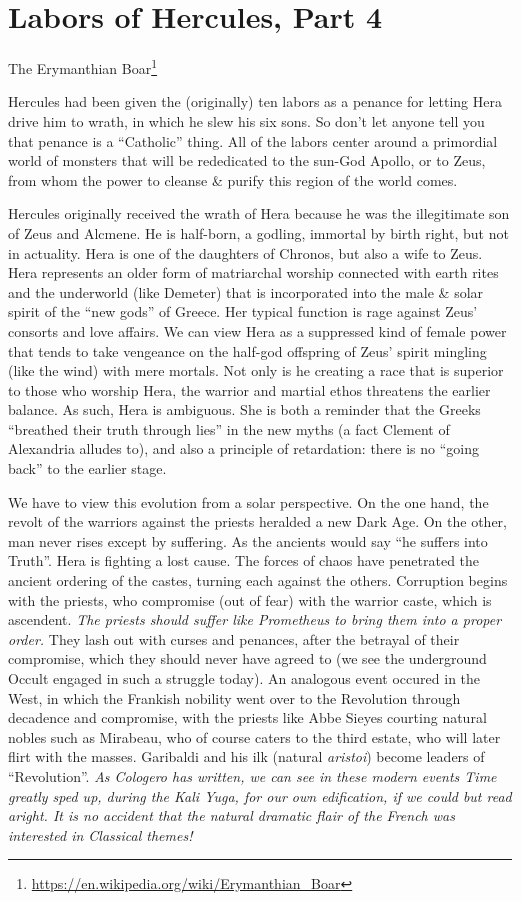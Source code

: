 \section{Labors of Hercules, Part 4}

The Erymanthian Boar\footnote{\url{https://en.wikipedia.org/wiki/Erymanthian\_Boar}}

Hercules had been given the (originally) ten labors as a penance for letting Hera drive him to wrath, in which he slew his six sons. So don't let anyone tell you that penance is a ``Catholic'' thing. All of the labors center around a primordial world of monsters that will be rededicated to the sun-God Apollo, or to Zeus, from whom the power to cleanse \& purify this region of the world comes.

Hercules originally received the wrath of Hera because he was the illegitimate son of Zeus and Alcmene. He is half-born, a godling, immortal by birth right, but not in actuality. Hera is one of the daughters of Chronos, but also a wife to Zeus. Hera represents an older form of matriarchal worship connected with earth rites and the underworld (like Demeter) that is incorporated into the male \& solar spirit of the ``new gods'' of Greece. Her typical function is rage against Zeus' consorts and love affairs. We can view Hera as a suppressed kind of female power that tends to take vengeance on the half-god offspring of Zeus' spirit mingling (like the wind) with mere mortals. Not only is he creating a race that is superior to those who worship Hera, the warrior and martial ethos threatens the earlier balance. As such, Hera is ambiguous. She is both a reminder that the Greeks ``breathed their truth through lies'' in the new myths (a fact Clement of Alexandria alludes to), and also a principle of retardation: there is no ``going back'' to the earlier stage.

We have to view this evolution from a solar perspective. On the one hand, the revolt of the warriors against the priests heralded a new Dark Age. On the other, man never rises except by suffering. As the ancients would say ``he suffers into Truth''. Hera is fighting a lost cause. The forces of chaos have penetrated the ancient ordering of the castes, turning each against the others. Corruption begins with the priests, who compromise (out of fear) with the warrior caste, which is ascendent.
\emph{The priests should suffer like Prometheus to bring them into a proper order.} They lash out with curses and penances, after the betrayal of their compromise, which they should never have agreed to (we see the underground Occult engaged in such a struggle today). An analogous event occured in the West, in which the Frankish nobility went over to the Revolution through decadence and compromise, with the priests like Abbe Sieyes courting natural nobles such as Mirabeau, who of course caters to the third estate, who will later flirt with the masses. Garibaldi and his ilk (natural \emph{aristoi}) become leaders of ``Revolution''. \emph{As Cologero has written, we can see in these modern events Time greatly sped up, during the Kali Yuga, for our own edification, if we could but read aright. It is no accident that the natural dramatic flair of the French was interested in Classical themes!}

